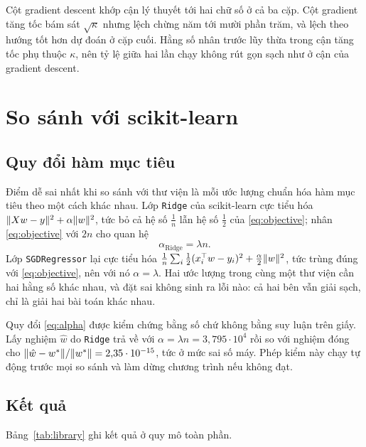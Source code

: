 \documentclass[12pt, a4paper, oneside]{report}
\theoremstyle{definition}
\begin{document}
Cột gradient descent khớp cận lý thuyết tới hai chữ số ở cả ba cặp. Cột gradient
tăng tốc bám sát $\sqrt{\kappa}$ nhưng lệch chừng năm tới mười phần trăm, và lệch
theo hướng tốt hơn dự đoán ở cặp cuối. Hằng số nhân trước lũy thừa trong cận tăng
tốc phụ thuộc $\kappa$, nên tỷ lệ giữa hai lần chạy không rút gọn sạch như ở cận
của gradient descent.

\chapter{So sánh với scikit-learn}\label{ch:library}

\section{Quy đổi hàm mục tiêu}

Điểm dễ sai nhất khi so sánh với thư viện là mỗi ước lượng chuẩn hóa hàm mục tiêu
theo một cách khác nhau. Lớp \texttt{Ridge} của scikit-learn
\cite{pedregosa2011scikit} cực tiểu hóa $\lVert Xw-y\rVert^{2} + \alpha \lVert w\rVert^{2}$,
tức bỏ cả hệ số $\frac{1}{n}$ lẫn hệ số $\frac{1}{2}$ của \eqref{eq:objective};
nhân \eqref{eq:objective} với $2n$ cho quan hệ
\begin{equation}\label{eq:alpha}
  \alpha_{\text{Ridge}} = \lambda n .
\end{equation}
Lớp \texttt{SGDRegressor} lại cực tiểu hóa
$\frac{1}{n}\sum_i \frac{1}{2}(x_i^{\top} w - y_i)^{2} + \frac{\alpha}{2}\lVert w\rVert^{2}$,
tức trùng đúng với \eqref{eq:objective}, nên với nó $\alpha = \lambda$. Hai ước
lượng trong cùng một thư viện cần hai hằng số khác nhau, và đặt sai không sinh ra
lỗi nào: cả hai bên vẫn giải sạch, chỉ là giải hai bài toán khác nhau.

Quy đổi \eqref{eq:alpha} được kiểm chứng bằng số chứ không bằng suy luận trên
giấy. Lấy nghiệm $\hat{w}$ do \texttt{Ridge} trả về với
$\alpha = \lambda n = 3{,}795 \cdot 10^{4}$ rồi so với nghiệm đóng cho
$\lVert\hat{w} - w^{*}\rVert / \lVert w^{*}\rVert = 2{,}35 \cdot 10^{-15}$, tức ở mức sai
số máy. Phép kiểm này chạy tự động trước mọi so sánh và làm dừng chương trình nếu
không đạt.

\section{Kết quả}

Bảng~\ref{tab:library} ghi kết quả ở quy mô toàn phần.
\end{document}
